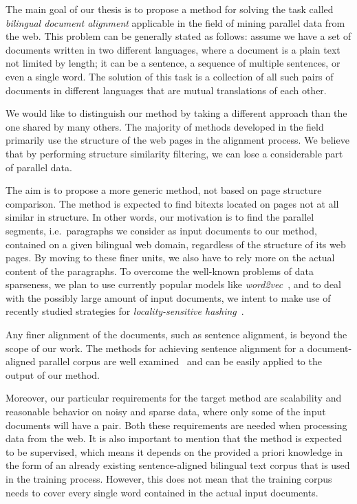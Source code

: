 The main goal of our thesis is to propose a method for solving the task called \textit{bilingual document alignment} applicable in the field of mining parallel data from the web. This problem can be generally stated as follows: assume we have a set of documents written in two different languages, where a document is a plain text not limited by length; it can be a sentence, a sequence of multiple sentences, or even a single word. The solution of this task is a collection of all such pairs of documents in different languages that are mutual translations of each other.

We would like to distinguish our method by taking a different approach than the one shared by many others. The majority of methods developed in the field primarily use the structure of the web pages in the alignment process. We believe that by performing structure similarity filtering, we can lose a considerable part of parallel data. 

The aim is to propose a more generic method, not based on page structure comparison. The method is expected to find bitexts located on pages not at all similar in structure. In other words, our motivation is to find the parallel segments, i.e.\ paragraphs we consider as input documents to our method, contained on a given bilingual web domain, regardless of the structure of its web pages. By moving to these finer units, we also have to rely more on the actual content of the paragraphs. To overcome the well-known problems of data sparseness, we plan to use currently popular models like \textit{word2vec}~\cite{Mikolov13a}\cite{Mikolov13b}\cite{Mikolov13c}, and to deal with the possibly large amount of input documents, we intent to make use of recently studied strategies for \textit{locality-sensitive hashing}~\cite{Charikar02}\cite{Andoni08}.

Any finer alignment of the documents, such as sentence alignment, is beyond the scope of our work. The methods for achieving sentence alignment for a document-aligned parallel corpus are well examined~\cite{Tiedemann11} and can be easily applied to the output of our method. 

Moreover, our particular requirements for the target method are scalability and reasonable behavior on noisy and sparse data, where only some of the input documents will have a pair. Both these requirements are needed when processing data from the web. It is also important to mention that the method is expected to be supervised, which means it depends on the provided a priori knowledge in the form of an already existing sentence-aligned bilingual text corpus that is used in the training process. However, this does not mean that the training corpus needs to cover every single word contained in the actual input documents. 


